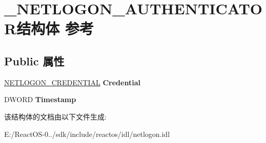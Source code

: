 \hypertarget{struct___n_e_t_l_o_g_o_n___a_u_t_h_e_n_t_i_c_a_t_o_r}{}\section{\+\_\+\+N\+E\+T\+L\+O\+G\+O\+N\+\_\+\+A\+U\+T\+H\+E\+N\+T\+I\+C\+A\+T\+O\+R结构体 参考}
\label{struct___n_e_t_l_o_g_o_n___a_u_t_h_e_n_t_i_c_a_t_o_r}
\subsection*{Public 属性}
\begin{DoxyCompactItemize}
\item 
\mbox{\label{struct___n_e_t_l_o_g_o_n___a_u_t_h_e_n_t_i_c_a_t_o_r_a2b891fbde5b8f340d7216e72753deded}} 
\hyperlink{struct___n_e_t_l_o_g_o_n___c_r_e_d_e_n_t_i_a_l}{N\+E\+T\+L\+O\+G\+O\+N\+\_\+\+C\+R\+E\+D\+E\+N\+T\+I\+AL} {\bfseries Credential}
\item 
\mbox{\label{struct___n_e_t_l_o_g_o_n___a_u_t_h_e_n_t_i_c_a_t_o_r_aa2845270b119038ccaaecebb8bbd0795}} 
D\+W\+O\+RD {\bfseries Timestamp}
\end{DoxyCompactItemize}


该结构体的文档由以下文件生成\+:\begin{DoxyCompactItemize}
\item 
E\+:/\+React\+O\+S-\/0../sdk/include/reactos/idl/netlogon.\+idl\end{DoxyCompactItemize}
